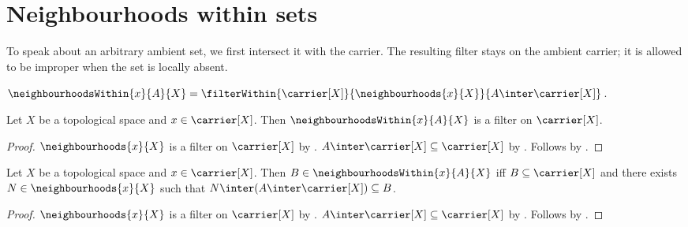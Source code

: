 \section{Neighbourhoods within sets}




To speak about an arbitrary ambient set, we first intersect it with the
carrier.  The resulting filter stays on the ambient carrier; it is allowed to
be improper when the set is locally absent.

\begin{definition}\label{neighbourhoods_within}
    $\neighbourhoodsWithin{x}{A}{X}
        =\filterWithin{\carrier[X]}{\neighbourhoods{x}{X}}{
            A\inter\carrier[X]}$.
\end{definition}

\begin{classification}\label{neighbourhoods_within_is_filter}
    Let $X$ be a topological space and $x\in\carrier[X]$.
    Then $\neighbourhoodsWithin{x}{A}{X}$ is a filter on $\carrier[X]$.
\end{classification}
\begin{proof}
    $\neighbourhoods{x}{X}$ is a filter on $\carrier[X]$ by
        .
    $A\inter\carrier[X]\subseteq\carrier[X]$ by
        .
    Follows by .
\end{proof}

\begin{theorem}\label{neighbourhoods_within_iff}
    Let $X$ be a topological space and $x\in\carrier[X]$.
    Then $B\in\neighbourhoodsWithin{x}{A}{X}$ iff
        $B\subseteq\carrier[X]$ and there exists
        $N\in\neighbourhoods{x}{X}$ such that
        $N\inter(A\inter\carrier[X])\subseteq B$.
\end{theorem}
\begin{proof}
    $\neighbourhoods{x}{X}$ is a filter on $\carrier[X]$ by
        .
    $A\inter\carrier[X]\subseteq\carrier[X]$ by
        .
    Follows by .
\end{proof}


